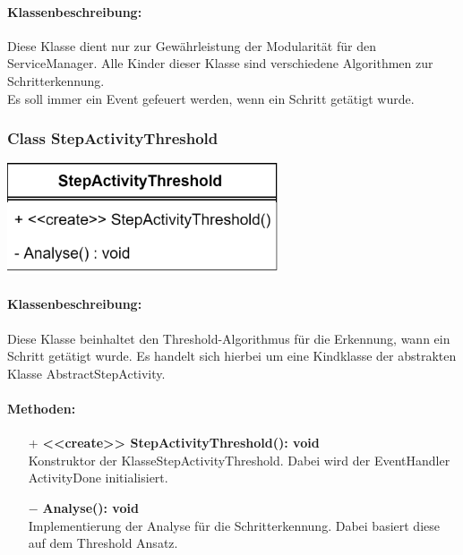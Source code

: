 \documentclass[a4paper,12pt]{article}
\begin{document}
	\paragraph{Klassenbeschreibung:}
	Diese Klasse dient nur zur Gewährleistung der Modularität für den ServiceManager. Alle Kinder dieser Klasse sind verschiedene Algorithmen zur Schritterkennung.\\ Es soll immer ein Event gefeuert werden, wenn ein Schritt getätigt wurde.\\
	\newline
	\begin{minipage}[b]{0.6\textwidth}
		\subsubsection{Class StepActivityThreshold}
		\end{minipage}
		\begin{minipage}[c]{0.5\textwidth}
			\includegraphics[width=0.6\textwidth]{bilder/EMKlassen/StepActivityThresholdClass.png}
		\end{minipage}
	\paragraph{Klassenbeschreibung:}
	Diese Klasse beinhaltet den Threshold-Algorithmus für die Erkennung, wann ein Schritt getätigt wurde. Es handelt sich hierbei um eine Kindklasse der abstrakten Klasse AbstractStepActivity. 
	\paragraph{Methoden:}
	\begin{itemize}
		\item [+]\textbf{<<create>> StepActivityThreshold(): void}\\Konstruktor der KlasseStepActivityThreshold. Dabei wird der EventHandler ActivityDone initialisiert. 
		\item [$-$]\textbf{Analyse(): void}\\ Implementierung der Analyse für die Schritterkennung. Dabei basiert diese auf dem Threshold Ansatz.\\
	\end{itemize}
	
\end{document}
